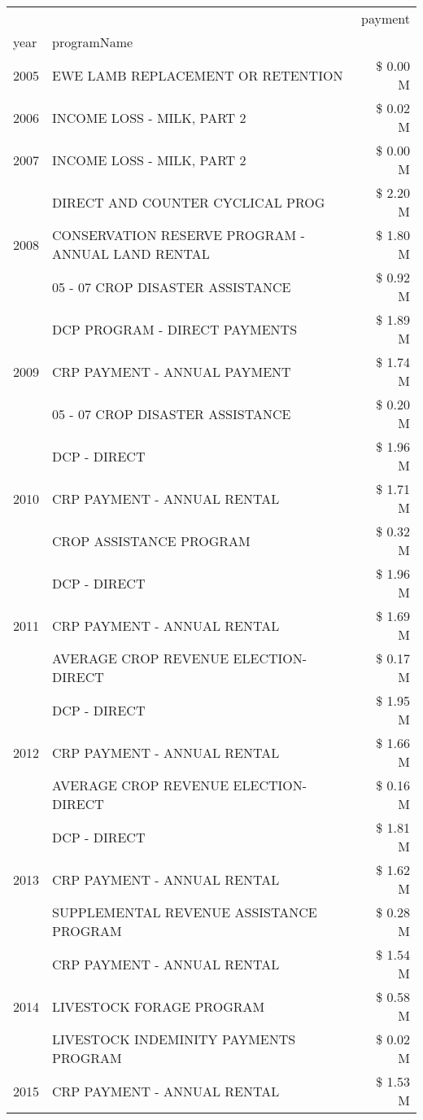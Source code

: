 \begin{tabular}{llr}
\toprule
 &  & payment \\
year & programName &  \\
\midrule
2005 & EWE LAMB REPLACEMENT OR RETENTION & \$ 0.00 M \\
\cline{1-3}
2006 & INCOME LOSS - MILK, PART 2 & \$ 0.02 M \\
\cline{1-3}
2007 & INCOME LOSS - MILK, PART 2 & \$ 0.00 M \\
\cline{1-3}
\multirow[t]{3}{*}{2008} & DIRECT AND COUNTER CYCLICAL PROG & \$ 2.20 M \\
 & CONSERVATION RESERVE PROGRAM - ANNUAL LAND RENTAL & \$ 1.80 M \\
 & 05 - 07 CROP DISASTER ASSISTANCE & \$ 0.92 M \\
\cline{1-3}
\multirow[t]{3}{*}{2009} & DCP PROGRAM - DIRECT PAYMENTS & \$ 1.89 M \\
 & CRP PAYMENT - ANNUAL PAYMENT & \$ 1.74 M \\
 & 05 - 07 CROP DISASTER ASSISTANCE & \$ 0.20 M \\
\cline{1-3}
\multirow[t]{3}{*}{2010} & DCP - DIRECT & \$ 1.96 M \\
 & CRP PAYMENT - ANNUAL RENTAL & \$ 1.71 M \\
 & CROP ASSISTANCE PROGRAM & \$ 0.32 M \\
\cline{1-3}
\multirow[t]{3}{*}{2011} & DCP - DIRECT & \$ 1.96 M \\
 & CRP PAYMENT - ANNUAL RENTAL & \$ 1.69 M \\
 & AVERAGE CROP REVENUE ELECTION-DIRECT & \$ 0.17 M \\
\cline{1-3}
\multirow[t]{3}{*}{2012} & DCP - DIRECT & \$ 1.95 M \\
 & CRP PAYMENT - ANNUAL RENTAL & \$ 1.66 M \\
 & AVERAGE CROP REVENUE ELECTION-DIRECT & \$ 0.16 M \\
\cline{1-3}
\multirow[t]{3}{*}{2013} & DCP - DIRECT & \$ 1.81 M \\
 & CRP PAYMENT - ANNUAL RENTAL & \$ 1.62 M \\
 & SUPPLEMENTAL REVENUE ASSISTANCE PROGRAM & \$ 0.28 M \\
\cline{1-3}
\multirow[t]{3}{*}{2014} & CRP PAYMENT - ANNUAL RENTAL & \$ 1.54 M \\
 & LIVESTOCK FORAGE PROGRAM & \$ 0.58 M \\
 & LIVESTOCK INDEMINITY PAYMENTS PROGRAM & \$ 0.02 M \\
\cline{1-3}
\multirow[t]{3}{*}{2015} & CRP PAYMENT - ANNUAL RENTAL & \$ 1.53 M \\

\end{tabular}
